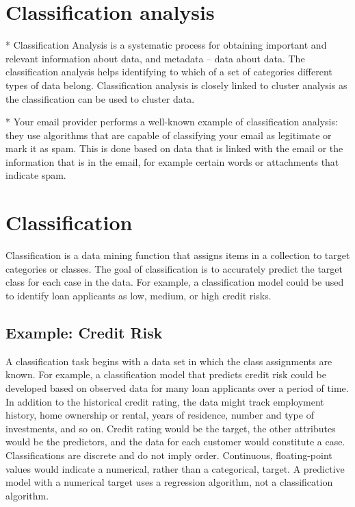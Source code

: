 

\section{Classification analysis}

*  Classification Analysis is a systematic process for obtaining important and relevant information about data, and metadata – data about data. The classification analysis helps identifying to which of a set of categories different types of data belong. Classification analysis is closely linked to cluster analysis as the classification can be used to cluster data.

*  Your email provider performs a well-known example of classification analysis: they use algorithms that are capable of classifying your email as legitimate or mark it as spam. This is done based on data that is linked with the email or the information that is in the email, for example certain words or attachments that indicate spam.


\section{Classification}
Classification is a data mining function that assigns items in a collection to target categories or classes. The goal of classification is to accurately predict the target class for each case in the data. For example, a classification model could be used to identify loan applicants as low, medium, or high credit risks.

\subsection{Example: Credit Risk}
A classification task begins with a data set in which the class assignments are known. For example, a classification model that predicts credit risk could be developed based on observed data for many loan applicants over a period of time. In addition to the historical credit rating, the data might track employment history, home ownership or rental, years of residence, number and type of investments, and so on. Credit rating would be the target, the other attributes would be the predictors, and the data for each customer would constitute a case.
Classifications are discrete and do not imply order. Continuous, floating-point values would indicate a numerical, rather than a categorical, target. A predictive model with a numerical target uses a regression algorithm, not a classification algorithm.

